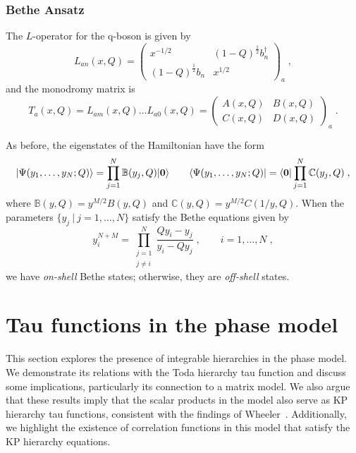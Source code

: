 \documentclass[a4paper,11pt]{amsart}
\begin{document}

\subsubsection{Bethe Ansatz}
The \(L\)-operator for the q-boson is given by
\begin{equation}
  L_{an}(x, Q) =
  \begin{pmatrix}
    x^{-1/2} & (1 - Q)^{\frac{1}{2}} b_n^\dagger \\ (1 - Q)^{\frac{1}{2}} b_n & x^{1/2}
  \end{pmatrix}_a\; ,
\end{equation}
and the monodromy matrix is 
\begin{equation}
  T_a(x,Q) = L_{am}(x, Q)  \dots  L_{a0}(x, Q) = 
  \begin{pmatrix}
    A(x, Q) & B(x, Q) \\ C(x, Q) & D(x, Q)
  \end{pmatrix}_a\; .
\end{equation}

As before, the eigenstates of the Hamiltonian have the form
\begin{equation}
  \lvert\Psi(y_1, \dots, y_N; Q)\rangle = \prod_{j=1}^N \mathbb{B}(y_j, Q) \lvert\bm{0}\rangle\qquad 
  \langle\Psi(y_1, \dots, y_N; Q)\rvert = \langle\bm{0}\rvert\prod_{j=1}^N \mathbb{C}(y_j, Q) \; ,
\end{equation}
where \(\mathbb{B}(y, Q) = y^{M/2} B(y, Q)\) and \(\mathbb{C}(y, Q) =
y^{M/2} C(1/y, Q)\). When the parameters \(\{ y_j \ | \ j =1, \dots , N\}\)
satisfy the Bethe equations given by
\begin{equation}
  y^{N + M}_i =\prod_{\substack{j = 1 \\ j \neq i}}^N\frac{Q y_i - y_j}{y_i - Q y_j}\; , \qquad i = 1, \dots, N\; , 
\end{equation}
we have \emph{on-shell} Bethe states; otherwise, they are \emph{off-shell} states.



\section{Tau functions in the phase model}

This section explores the presence of integrable hierarchies in the
phase model. We demonstrate its relations with the Toda hierarchy tau
function and discuss some implications, particularly its connection to
a matrix model. We also argue that these results imply that the scalar
products in the model also serve as KP hierarchy tau functions,
consistent with the findings of
Wheeler~\cite{Wheeler:2010vmq}. Additionally, we highlight the
existence of correlation functions in this model that satisfy the KP
hierarchy equations.
\end{document}
